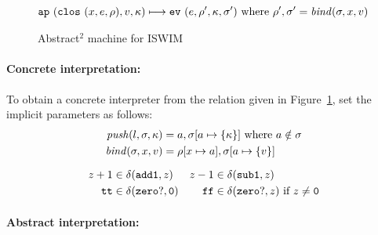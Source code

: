 \documentclass{llncs}
\begin{document}
\begin{figure}
\begin{align*}
\\[2mm]
{\tt ap\ }({{\tt clos\ }({x,e,\rho}),v,\kappa}) & \longmapsto
{\tt ev\ }({e,\rho',\kappa,\sigma'})
\text{ where }\rho',\sigma' = \mathit{bind}(\sigma,x,v)
\\
\end{align*}
\caption{Abstract$^2$ machine for ISWIM}
\label{fig:aam}
\end{figure}

\paragraph{Concrete interpretation:}

To obtain a concrete interpreter from the relation given in
Figure~\ref{fig:aam}, set the implicit parameters as follows:
\begin{gather}
\begin{align*}
\mathit{push}(l,\sigma,\kappa) &= a,\sigma[a\mapsto\{\kappa\}]
\mbox{ where }a \notin\sigma
\\
\mathit{bind}(\sigma,x,v) &= \rho[x\mapsto a],\sigma[a\mapsto\{v\}]
\end{align*}
\\[2mm]
\begin{align*}
z+1 &\in \delta({\tt add1},z) &
z-1 &\in \delta({\tt sub1},z)\\
{\tt tt} &\in \delta({\tt zero?},{\tt 0}) &
{\tt ff} &\in \delta({\tt zero?},z)\text{ if }z\neq {\tt 0}\\
\end{align*}
\end{gather}

\paragraph{Abstract interpretation:}
\end{document}

